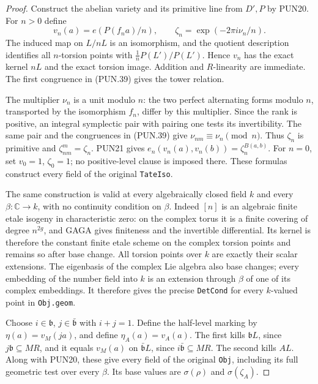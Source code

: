 \begin{proof}
Construct the abelian variety and its primitive line from
\(D',P\) by PUN20.  For \(n>0\) define
\[
 v_n(a)=e(P(f_na)/n),\qquad
                         \zeta_n=\exp(-2\pi i\nu_n/n).
 \tag{PUN.40}
\]
The induced map on \(L/nL\) is an isomorphism, and the
quotient description identifies all \(n\)-torsion points with
\(\tfrac1nP(L')/P(L')\).  Hence \(v_n\) has the exact
kernel \(nL\) and the exact torsion image.  Addition and
\(R\)-linearity are immediate.  The first congruence in
(PUN.39) gives the tower relation.

The multiplier \(\nu_n\) is a unit modulo \(n\): the two
perfect alternating forms modulo \(n\), transported by the
isomorphism \(f_n\), differ by this multiplier.  Since the
rank is positive, an integral symplectic pair with pairing one
tests its invertibility.  The same pair and the congruences
in (PUN.39) give \(\nu_{nm}\equiv\nu_n\pmod n\).
Thus \(\zeta_n\) is primitive and
\(\zeta_{nm}^m=\zeta_n\).  PUN21 gives
\(e_n(v_n(a),v_n(b))=\zeta_n^{B(a,b)}\).
For \(n=0\), set \(v_0=1\), \(\zeta_0=1\); no positive-level
clause is imposed there.  These formulas construct every
field of the original \texttt{TateIso}.

The same construction is valid at every algebraically closed
field \(k\) and every \(\beta:\mathbb C\to k\), with no
continuity condition on \(\beta\).  Indeed \([n]\) is an
algebraic finite etale isogeny in characteristic zero: on the
complex torus it is a finite covering of degree \(n^{2g}\),
and GAGA gives finiteness and the invertible differential.
Its kernel is therefore the constant finite etale scheme on
the complex torsion points and remains so after base change.
All torsion points over \(k\) are exactly their scalar
extensions.  The eigenbasis of the complex Lie algebra also
base changes; every embedding of the number field into \(k\)
is an extension through \(\beta\) of one of its complex
embeddings.  It therefore gives the precise \texttt{DetCond}
for every \(k\)-valued point in \texttt{Obj.geom}.

Choose \(i\in\mathfrak b\), \(j\in\bar{\mathfrak b}\)
with \(i+j=1\).  Define the half-level marking by
\(\eta(a)=v_M(ja)\), and define \(\eta_A(a)=v_A(a)\).
The first kills \(\mathfrak bL\), since
\(j\mathfrak b\subseteq MR\), and it equals \(v_M(a)\)
on \(\bar{\mathfrak b}L\), since
\(i\bar{\mathfrak b}\subseteq MR\).  The second kills
\(AL\).  Along with PUN20, these give every field of the
original \texttt{Obj}, including its full geometric test
over every \(\beta\).  Its base values are
\(\sigma(\rho)\) and \(\sigma(\zeta_A)\).


\end{proof}
